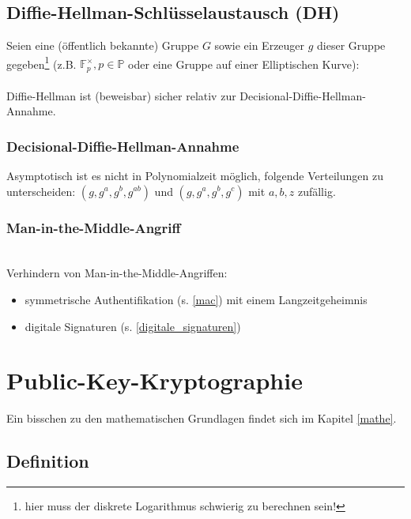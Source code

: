\documentclass[a4paper,twoside,DIV15,BCOR12mm]{scrbook}
\begin{document}
\section{Diffie-Hellman-Schlüsselaustausch (DH)}

Seien eine (öffentlich bekannte) Gruppe $G$ sowie ein Erzeuger $g$ dieser Gruppe gegeben\footnote{hier muss der diskrete Logarithmus schwierig zu berechnen sein!} (z.B. $\mathbb{F}_p^\times, p \in \mathbb{P}$ oder eine Gruppe auf einer Elliptischen Kurve):\\

\\

Diffie-Hellman ist (beweisbar) sicher relativ zur Decisional-Diffie-Hellman-Annahme.

\subsection{Decisional-Diffie-Hellman-Annahme}

Asymptotisch ist es nicht in Polynomialzeit möglich, folgende Verteilungen zu unterscheiden: $(g, g^a, g^b, g^{ab})$ und $(g, g^a, g^b, g^c)$ mit $a, b, z$ zufällig.

\subsection{Man-in-the-Middle-Angriff}

\\

Verhindern von Man-in-the-Middle-Angriffen:

\begin{itemize}
	\item symmetrische Authentifikation (s. \ref{mac}) mit einem Langzeitgeheimnis
	\item digitale Signaturen (s. \ref{digitale_signaturen})
\end{itemize}


\chapter{Public-Key-Kryptographie}

Ein bisschen zu den mathematischen Grundlagen findet sich im Kapitel \ref{mathe}.

\section{Definition}
\end{document}
